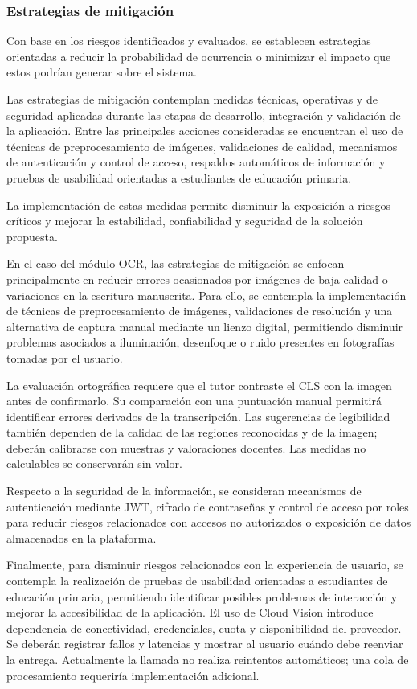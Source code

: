 \subsubsection{Estrategias de mitigación}

Con base en los riesgos identificados y evaluados, se establecen estrategias orientadas a reducir la probabilidad de ocurrencia o minimizar el impacto que estos podrían generar sobre el sistema.

Las estrategias de mitigación contemplan medidas técnicas, operativas y de seguridad aplicadas durante las etapas de desarrollo, integración y validación de la aplicación. Entre las principales acciones consideradas se encuentran el uso de técnicas de preprocesamiento de imágenes, validaciones de calidad, mecanismos de autenticación y control de acceso, respaldos automáticos de información y pruebas de usabilidad orientadas a estudiantes de educación primaria.

La implementación de estas medidas permite disminuir la exposición a riesgos críticos y mejorar la estabilidad, confiabilidad y seguridad de la solución propuesta.

En el caso del módulo OCR, las estrategias de mitigación se enfocan principalmente en reducir errores ocasionados por imágenes de baja calidad o variaciones en la escritura manuscrita. Para ello, se contempla la implementación de técnicas de preprocesamiento de imágenes, validaciones de resolución y una alternativa de captura manual mediante un lienzo digital, permitiendo disminuir problemas asociados a iluminación, desenfoque o ruido presentes en fotografías tomadas por el usuario.

La evaluación ortográfica requiere que el tutor contraste el CLS con la imagen antes de confirmarlo. Su comparación con una puntuación manual permitirá identificar errores derivados de la transcripción. Las sugerencias de legibilidad también dependen de la calidad de las regiones reconocidas y de la imagen; deberán calibrarse con muestras y valoraciones docentes. Las medidas no calculables se conservarán sin valor.

Respecto a la seguridad de la información, se consideran mecanismos de autenticación mediante JWT, cifrado de contraseñas y control de acceso por roles para reducir riesgos relacionados con accesos no autorizados o exposición de datos almacenados en la plataforma.

Finalmente, para disminuir riesgos relacionados con la experiencia de usuario, se contempla la realización de pruebas de usabilidad orientadas a estudiantes de educación primaria, permitiendo identificar posibles problemas de interacción y mejorar la accesibilidad de la aplicación.
El uso de Cloud Vision introduce dependencia de conectividad, credenciales, cuota y disponibilidad del proveedor. Se deberán registrar fallos y latencias y mostrar al usuario cuándo debe reenviar la entrega. Actualmente la llamada no realiza reintentos automáticos; una cola de procesamiento requeriría implementación adicional.

